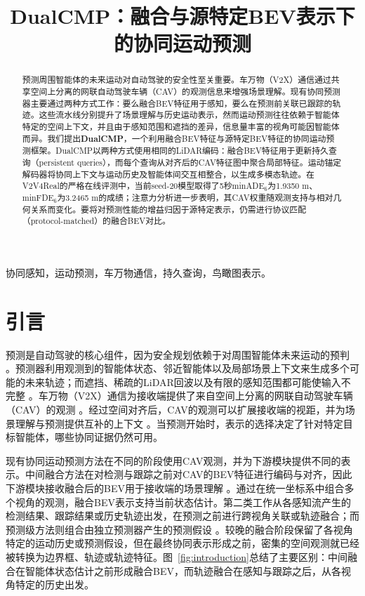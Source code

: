 \documentclass[lettersize,journal]{IEEEtran}
\begin{document}
\title{DualCMP：融合与源特定BEV表示下的协同运动预测}

\author{}

\maketitle

\begin{abstract}
预测周围智能体的未来运动对自动驾驶的安全性至关重要。车万物（V2X）通信通过共享空间上分离的网联自动驾驶车辆（CAV）的观测信息来增强场景理解。现有协同预测器主要通过两种方式工作：要么融合BEV特征用于感知，要么在预测前关联已跟踪的轨迹。这些流水线分别提升了场景理解与历史运动表示，然而运动预测往往依赖于智能体特定的空间上下文，并且由于感知范围和遮挡的差异，信息量丰富的视角可能因智能体而异。我们提出\textbf{DualCMP}，一个利用融合BEV特征与源特定BEV特征的协同运动预测框架。DualCMP以两种方式使用相同的LiDAR编码：融合BEV特征用于更新持久查询（persistent queries），而每个查询从对齐后的CAV特征图中聚合局部特征。运动锚定解码器将协同上下文与运动历史及智能体间交互相整合，以生成多模态轨迹。在V2V4Real的严格在线评测中，当前seed-20模型取得了5秒minADE$_6$为1.9350 m、minFDE$_6$为3.2465 m的成绩；注意力分析进一步表明，其CAV权重随观测支持与相对几何关系而变化。要将对预测性能的增益归因于源特定表示，仍需进行协议匹配（protocol-matched）的融合BEV对比。
\end{abstract}

\begin{IEEEkeywords}
协同感知，运动预测，车万物通信，持久查询，鸟瞰图表示。
\end{IEEEkeywords}

\section{引言}
预测是自动驾驶的核心组件，因为安全规划依赖于对周围智能体未来运动的预判 \cite{zhou2022hivt,zhou2023qcnet}。预测器利用观测到的智能体状态、邻近智能体以及局部场景上下文来生成多个可能的未来轨迹；而遮挡、稀疏的LiDAR回波以及有限的感知范围都可能使输入不完整 \cite{zhou2022hivt,zhou2023qcnet}。车万物（V2X）通信为接收端提供了来自空间上分离的网联自动驾驶车辆（CAV）的观测 \cite{xu2023v2v4real,wang2020v2vnet}。经过空间对齐后，CAV的观测可以扩展接收端的视距，并为场景理解与预测提供互补的上下文 \cite{wang2020v2vnet,zhou2025v2xpnp}。当预测开始时，表示的选择决定了针对特定目标智能体，哪些协同证据仍然可用。

现有协同运动预测方法在不同的阶段使用CAV观测，并为下游模块提供不同的表示。中间融合方法在对检测与跟踪之前对CAV的BEV特征进行编码与对齐，因此下游模块接收融合后的BEV用于接收端的场景理解 \cite{wang2020v2vnet,wang2025cmp,zhou2025v2xpnp}。通过在统一坐标系中组合多个视角的观测，融合BEV表示支持当前状态估计。第二类工作从各感知流产生的检测结果、跟踪结果或历史轨迹出发，在预测之前进行跨视角关联或轨迹融合；而预测级方法则组合由独立预测器产生的预测假设 \cite{yu2023v2xseq,ruan2024v2xgraph,wu2025copad,zhang2025comtp,wang2025cmp,madjid2026latefusion}。较晚的融合阶段保留了各视角特定的运动历史或预测假设，但在最终协同表示形成之前，密集的空间观测就已经被转换为边界框、轨迹或轨迹特征。图~\ref{fig:introduction}总结了主要区别：中间融合在智能体状态估计之前形成融合BEV，而轨迹融合在感知与跟踪之后，从各视角特定的历史出发。
\end{document}
